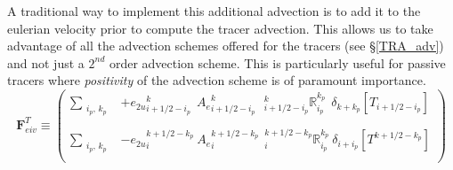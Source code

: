 \documentclass[NEMO_book]{subfiles}
\begin{document}
A traditional way to implement this additional advection is to add it to the eulerian 
velocity prior to compute the tracer advection. This allows us to take advantage of 
all the advection schemes offered for the tracers (see \S\ref{TRA_adv}) and not just 
a $2^{nd}$ order advection scheme. This is particularly useful for passive tracers 
where \emph{positivity} of the advection scheme is of paramount importance. 
\begin{equation} \label{Eq_eiv_vd}  
\textbf{F}_{eiv}^T   \equiv   \left( \begin{aligned}                                
 \sum_{\substack{i_p,\,k_p}} &
 +{e_{2u}}_{i+1/2-i_p}^{k}                                  \ \ {A_{e}}_{i+1/2-i_p}^{k} 
\ \ \ { _{i+1/2-i_p}^k \mathbb{R}_{i_p}^{k_p} }    \ \ \delta_{k+k_p}[T_{i+1/2-i_p}]      \\
    \\
 \sum_{\substack{i_p,\,k_p}} &
 - {e_{2u}}_i^{k+1/2-k_p}                                      \ {A_{e}}_i^{k+1/2-k_p} 
\ \ { _i^{k+1/2-k_p} \mathbb{R}_{i_p}^{k_p} }    \ \delta_{i+i_p}[T^{k+1/2-k_p}]    \\   
\end{aligned}   \right)
\end{equation}
\end{document}
